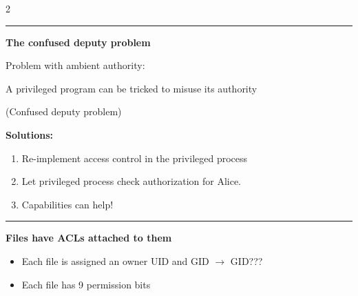 \documentclass[a4paper,9pt]{extarticle}
\newcommand{\separator}{
\vspace{2pt}
\hrule
\vspace{3pt}
}
\begin{document}
\begin{multicols}{2}
\separator


\textbf{The confused deputy problem}

Problem with ambient authority:

\begin{important}

A privileged program can be tricked to misuse its authority

(Confused deputy problem)

\end{important}


\textbf{Solutions:}

\begin{enumerate}[leftmargin=*, itemsep=1pt, topsep=1pt]

\item Re-implement access control in the privileged process

\item Let privileged process check authorization for Alice.

\item Capabilities can help!

\end{enumerate}


\separator


\textbf{Files have ACLs attached to them}

\begin{itemize}

\item Each file is assigned an owner UID and GID $\rightarrow$ GID???

\item Each file has 9 permission bits

\end{itemize}



\end{multicols}
\end{document}
